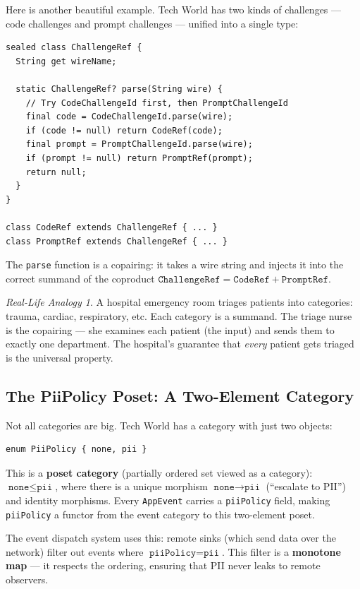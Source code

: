 \documentclass[12pt,a4paper]{article}
\theoremstyle{definition}
\theoremstyle{plain}
\theoremstyle{remark}
\newtheorem*{reallife}{Real-Life Analogy}
\begin{document}
Here is another beautiful example. Tech World has two kinds of challenges
--- code challenges and prompt challenges --- unified into a single type:

\begin{lstlisting}
sealed class ChallengeRef {
  String get wireName;

  static ChallengeRef? parse(String wire) {
    // Try CodeChallengeId first, then PromptChallengeId
    final code = CodeChallengeId.parse(wire);
    if (code != null) return CodeRef(code);
    final prompt = PromptChallengeId.parse(wire);
    if (prompt != null) return PromptRef(prompt);
    return null;
  }
}

class CodeRef extends ChallengeRef { ... }
class PromptRef extends ChallengeRef { ... }
\end{lstlisting}

The \texttt{parse} function is a copairing: it takes a wire string and injects
it into the correct summand of the coproduct
$\texttt{ChallengeRef} = \texttt{CodeRef} + \texttt{PromptRef}$.

\begin{reallife}
A hospital emergency room triages patients into categories:
trauma, cardiac, respiratory, etc.
Each category is a summand.
The triage nurse is the copairing --- she examines each patient (the input)
and sends them to exactly one department.
The hospital's guarantee that \emph{every} patient gets triaged
is the universal property.
\end{reallife}

\subsection{The PiiPolicy Poset: A Two-Element Category}

Not all categories are big. Tech World has a category with just two objects:

\begin{lstlisting}
enum PiiPolicy { none, pii }
\end{lstlisting}

This is a \textbf{poset category} (partially ordered set viewed as a category):
$\texttt{none} \leq \texttt{pii}$, where there is a unique morphism
$\texttt{none} \to \texttt{pii}$ (``escalate to PII'') and identity morphisms.
Every \texttt{AppEvent} carries a \texttt{piiPolicy} field, making
\texttt{piiPolicy} a functor from the event category to this two-element poset.

The event dispatch system uses this: remote sinks (which send data over the network)
filter out events where $\texttt{piiPolicy} = \texttt{pii}$.
This filter is a \textbf{monotone map} --- it respects the ordering, ensuring
that PII never leaks to remote observers.
\end{document}
